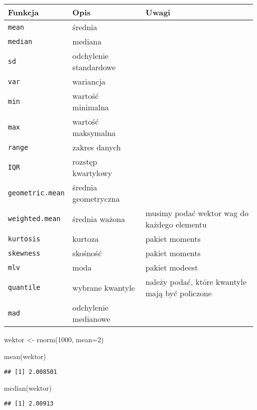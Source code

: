 \documentclass[
]{book}
\newenvironment{Shaded}{\begin{snugshade}}{\end{snugshade}}
\newcommand{\AttributeTok}[1]{\textcolor[rgb]{0.77,0.63,0.00}{#1}}
\newcommand{\DecValTok}[1]{\textcolor[rgb]{0.00,0.00,0.81}{#1}}
\newcommand{\FunctionTok}[1]{\textcolor[rgb]{0.00,0.00,0.00}{#1}}
\newcommand{\NormalTok}[1]{#1}
\newcommand{\OtherTok}[1]{\textcolor[rgb]{0.56,0.35,0.01}{#1}}
\begin{document}
\begin{longtable}[]{@{}lll@{}}
\toprule
Funkcja & Opis & Uwagi \\
\midrule
\endhead
\texttt{mean} & średnia & \\
\texttt{median} & mediana & \\
\texttt{sd} & odchylenie standardowe & \\
\texttt{var} & wariancja & \\
\texttt{min} & wartość minimalna & \\
\texttt{max} & wartość maksymalna & \\
\texttt{range} & zakres danych & \\
\texttt{IQR} & rozstęp kwartylowy & \\
\texttt{geometric.mean} & średnia geometryczna & \\
\texttt{weighted.mean} & średnia ważona & musimy podać wektor wag do każdego elementu \\
\texttt{kurtosis} & kurtoza & pakiet moments \\
\texttt{skewness} & skośność & pakiet moments \\
\texttt{mlv} & moda & pakiet modeest \\
\texttt{quantile} & wybrane kwantyle & należy podać, które kwantyle mają być policzone \\
\texttt{mad} & odchylenie medianowe & \\
\bottomrule
\end{longtable}

\begin{Shaded}
\begin{Highlighting}[]
\NormalTok{wektor }\OtherTok{\textless{}{-}} \FunctionTok{rnorm}\NormalTok{(}\DecValTok{1000}\NormalTok{, }\AttributeTok{mean=}\DecValTok{2}\NormalTok{)}

\FunctionTok{mean}\NormalTok{(wektor)}
\end{Highlighting}
\end{Shaded}

\begin{verbatim}
## [1] 2.008501
\end{verbatim}

\begin{Shaded}
\begin{Highlighting}[]
\FunctionTok{median}\NormalTok{(wektor)}
\end{Highlighting}
\end{Shaded}

\begin{verbatim}
## [1] 2.00913
\end{verbatim}
\end{document}
